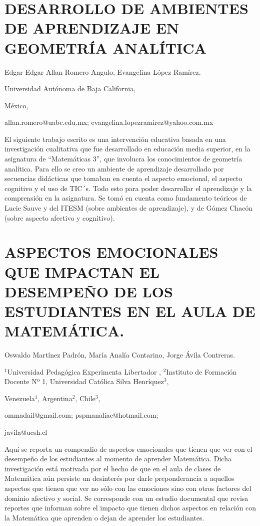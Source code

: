 \section{DESARROLLO DE AMBIENTES DE APRENDIZAJE EN GEOMETRÍA ANALÍTICA }

\begin{datos}

Edgar Edgar Allan Romero Angulo, Evangelina López Ramírez.

Universidad Autónoma de Baja California,

México,

allan.romero@uabc.edu.mx; evangelina.lopezramirez@yahoo.com.mx 

\end{datos}

El siguiente trabajo escrito es una intervención educativa basada
en una investigación cualitativa que fue desarrollado en educación
media superior, en la asignatura de “Matemáticas 3”, que involucra
los conocimientos de geometría analítica. Para ello se creo un ambiente
de aprendizaje desarrollado por secuencias didácticas que tomaban
en cuenta el aspecto emocional, el aspecto cognitivo y el uso de TIC´s.
Todo esto para poder desarrollar el aprendizaje y la comprensión en
la asignatura. Se tomó en cuenta como fundamento teóricos de Lucie
Sauve y del ITESM (sobre ambientes de aprendizaje), y de Gómez Chacón
(sobre aspecto afectivo y cognitivo). 

\setcounter{section}{147}


\section{ASPECTOS EMOCIONALES QUE IMPACTAN EL DESEMPEÑO DE LOS ESTUDIANTES
EN EL AULA DE MATEMÁTICA.}

\begin{datos}

Oswaldo Martínez Padrón, María Analía Contarino, Jorge Ávila Contreras.

$^{1}$Universidad Pedagógica Experimenta Libertador , $^{2}$Instituto
de Formación Docente Nº 1, Universidad Católica Silva Henríquez$^{3}$, 

Venezuela$^{1}$, Argentina$^{2}$, Chile$^{3}$,

ommadail@gmail.com; pspmanaliac@hotmail.com;

javila@ucsh.cl 

\end{datos}

Aquí se reporta un compendio de aspectos emocionales que tienen que
ver con el desempeño de los estudiantes al momento de aprender Matemática.
Dicha investigación está motivada por el hecho de que en el aula de
clases de Matemática aún persiste un desinterés por darle preponderancia
a aquellos aspectos que tienen que ver no sólo con las emociones sino
con otros factores del dominio afectivo y social. Se corresponde con
un estudio documental que revisa reportes que informan sobre el impacto
que tienen dichos aspectos en relación con la Matemática que aprenden
o dejan de aprender los estudiantes. 


